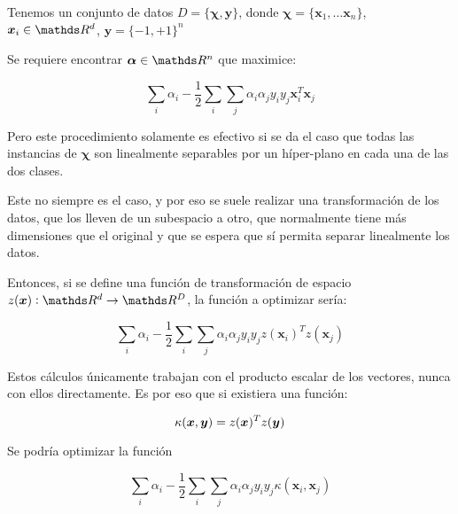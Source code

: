 Tenemos un conjunto de datos $D = \{\bm{\chi}, \bm{y}\}$, donde $\bm{\chi} = \{\bm{x}_1, \ldots \bm{x}_n\}$, $\bm{x}_i \in \reals^d$, $\bm{y} = \{-1, +1\}^n$

Se requiere encontrar $\bm{\alpha} \in \reals^n$ que maximice:

\begin{equation}
 \sum_i\alpha_i - \frac{1}{2}\sum_i\sum_j\alpha_i\alpha_jy_iy_j\bm{x}_i^T\bm{x}_j
\end{equation}

%

Pero este procedimiento solamente es efectivo si se da el caso que todas las
instancias de $\bm{\chi}$ son linealmente separables por un híper-plano en cada
una de las dos clases.

Este no siempre es el caso, y por eso se suele realizar una transformación de los
datos, que los lleven de un subespacio a otro, que normalmente tiene más dimensiones
que el original y que se espera que sí permita separar linealmente los datos.

Entonces, si se define una función de transformación de espacio
$z(\bm{x}) : \reals^d \rightarrow \reals^D$, la función a optimizar sería:

\begin{equation}
 \sum_i\alpha_i - \frac{1}{2}\sum_i\sum_j\alpha_i\alpha_jy_iy_jz(\bm{x}_i)^Tz(\bm{x}_j)
\end{equation}

Estos cálculos únicamente trabajan con el producto escalar de los vectores, nunca
con ellos directamente. Es por eso que si existiera una función:

\begin{equation}
 \kappa(\bm{x}, \bm{y}) = z(\bm{x})^Tz(\bm{y})
\end{equation}

Se podría optimizar la función

\begin{equation}
 \sum_i\alpha_i - \frac{1}{2}\sum_i\sum_j\alpha_i\alpha_jy_iy_j\kappa(\bm{x}_i, \bm{x}_j)
\end{equation}

